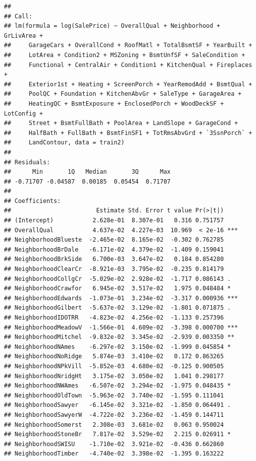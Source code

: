 \documentclass[american,]{article}
\theoremstyle{definition}
\theoremstyle{definition}
\theoremstyle{definition}
\theoremstyle{remark}
\begin{document}
\begin{verbatim}
## 
## Call:
## lm(formula = log(SalePrice) ~ OverallQual + Neighborhood + GrLivArea + 
##     GarageCars + OverallCond + RoofMatl + TotalBsmtSF + YearBuilt + 
##     LotArea + Condition2 + MSZoning + BsmtUnfSF + SaleCondition + 
##     Functional + CentralAir + Condition1 + KitchenQual + Fireplaces + 
##     Exterior1st + Heating + ScreenPorch + YearRemodAdd + BsmtQual + 
##     PoolQC + Foundation + KitchenAbvGr + SaleType + GarageArea + 
##     HeatingQC + BsmtExposure + EnclosedPorch + WoodDeckSF + LotConfig + 
##     Street + BsmtFullBath + PoolArea + LandSlope + GarageCond + 
##     HalfBath + FullBath + BsmtFinSF1 + TotRmsAbvGrd + `3SsnPorch` + 
##     LandContour, data = train2)
## 
## Residuals:
##      Min       1Q   Median       3Q      Max 
## -0.71707 -0.04587  0.00185  0.05454  0.71707 
## 
## Coefficients:
##                        Estimate Std. Error t value Pr(>|t|)    
## (Intercept)           2.628e-01  8.307e-01   0.316 0.751757    
## OverallQual           4.637e-02  4.227e-03  10.969  < 2e-16 ***
## NeighborhoodBlueste  -2.465e-02  8.165e-02  -0.302 0.762785    
## NeighborhoodBrDale   -6.171e-02  4.379e-02  -1.409 0.159041    
## NeighborhoodBrkSide   6.700e-03  3.647e-02   0.184 0.854280    
## NeighborhoodClearCr  -8.921e-03  3.795e-02  -0.235 0.814179    
## NeighborhoodCollgCr  -5.029e-02  2.928e-02  -1.717 0.086143 .  
## NeighborhoodCrawfor   6.945e-02  3.517e-02   1.975 0.048484 *  
## NeighborhoodEdwards  -1.073e-01  3.234e-02  -3.317 0.000936 ***
## NeighborhoodGilbert  -5.637e-02  3.129e-02  -1.801 0.071875 .  
## NeighborhoodIDOTRR   -4.823e-02  4.256e-02  -1.133 0.257396    
## NeighborhoodMeadowV  -1.566e-01  4.609e-02  -3.398 0.000700 ***
## NeighborhoodMitchel  -9.832e-02  3.345e-02  -2.939 0.003350 ** 
## NeighborhoodNAmes    -6.297e-02  3.150e-02  -1.999 0.045854 *  
## NeighborhoodNoRidge   5.874e-03  3.410e-02   0.172 0.863265    
## NeighborhoodNPkVill  -5.852e-03  4.680e-02  -0.125 0.900505    
## NeighborhoodNridgHt   3.175e-02  3.050e-02   1.041 0.298177    
## NeighborhoodNWAmes   -6.507e-02  3.294e-02  -1.975 0.048435 *  
## NeighborhoodOldTown  -5.963e-02  3.740e-02  -1.595 0.111041    
## NeighborhoodSawyer   -6.145e-02  3.321e-02  -1.850 0.064491 .  
## NeighborhoodSawyerW  -4.722e-02  3.236e-02  -1.459 0.144711    
## NeighborhoodSomerst   2.308e-03  3.681e-02   0.063 0.950024    
## NeighborhoodStoneBr   7.817e-02  3.529e-02   2.215 0.026911 *  
## NeighborhoodSWISU    -1.710e-02  3.921e-02  -0.436 0.662860    
## NeighborhoodTimber   -4.740e-02  3.398e-02  -1.395 0.163222    

\end{verbatim}
\end{document}
